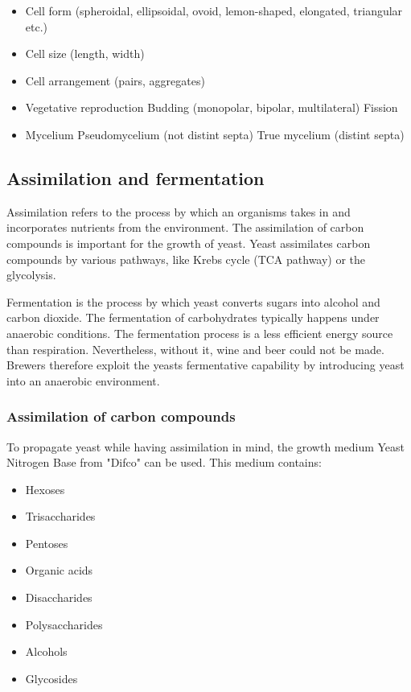 \begin{highlight}
    \begin{itemize}
        \item Cell form (spheroidal, ellipsoidal, ovoid, lemon-shaped, 
        elongated, triangular etc.)
        \item Cell size (length, width)
        \item Cell arrangement (pairs, aggregates)
        \item  Vegetative reproduction
        \subitem Budding (monopolar, bipolar, multilateral)
        \subitem Fission 
        \item Mycelium
        \subitem Pseudomycelium (not distint septa)
        \subitem True mycelium (distint septa)
    \end{itemize}
\end{highlight}

\subsection{Assimilation and fermentation}
Assimilation refers to the process by which an organisms takes in and incorporates nutrients from the environment. The assimilation of carbon compounds is important for the growth of yeast. Yeast assimilates carbon compounds by various pathways, like Krebs cycle (TCA pathway) or the glycolysis.

Fermentation is the process by which yeast converts sugars into alcohol and carbon dioxide. The fermentation of carbohydrates typically happens under anaerobic conditions. The fermentation process is a less efficient energy source than respiration. Nevertheless, without it, wine and beer could not be made. Brewers therefore exploit the yeasts fermentative capability by introducing yeast into an anaerobic environment. 

\subsubsection*{Assimilation of carbon compounds}
To propagate yeast while having assimilation in mind, the growth medium  Yeast Nitrogen Base from "Difco" can be used. This medium contains:

\begin{highlight}
    \begin{multicols}{3}
        \begin{itemize}
            \item Hexoses
            \item Trisaccharides
            \item Pentoses
            \item Organic acids
            \item Disaccharides
            \item Polysaccharides
            \item Alcohols
            \item Glycosides
        \end{itemize}
    \end{multicols}
\end{highlight}

